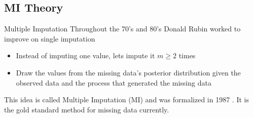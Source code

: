 \subsection{MI Theory}

\begin{frame}{Multiple Imputation}
Throughout the 70's and 80's Donald Rubin worked to improve on single imputation
\begin{itemize}
 \item Instead of imputing one value, lets impute it $m\geq 2$ times
 \item Draw the values from the missing data's posterior distribution given the observed
 data and the process that generated the missing data
\end{itemize}
This idea is called Multiple Imputation (MI) and was formalized in 1987 \cite{Rubin1987}. It is the gold standard method
for missing data currently.


\end{frame}


